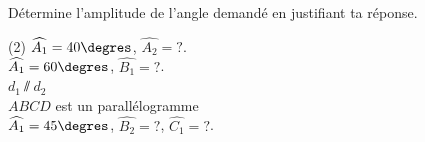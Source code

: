 %
%
    Détermine l'amplitude de l'angle demandé en justifiant ta réponse.
    \begin{tasks}(2)
        \task $\widehat{A_1}=40\degres$, $\widehat{A_2} = ?$.\\
        \task $\widehat{A_1}=60\degres$, $\widehat{B_1} = ?$.
        \\$d_1\sslash d_2$\\
            \task $ABCD$ est un parallélogramme \\ $\widehat{A_1}=45\degres$, $\widehat{B_2} = ?$, $\widehat{C_1}=?$.
        \\
    \end{tasks}
